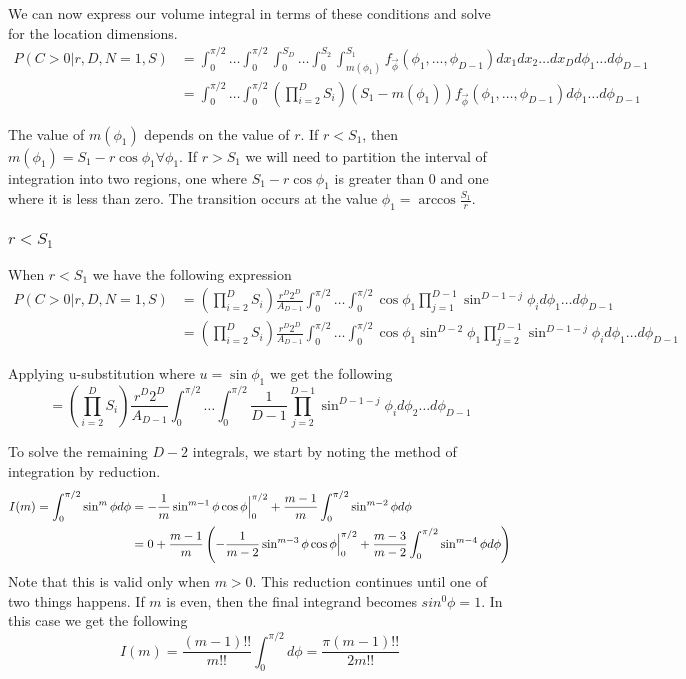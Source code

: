 \documentclass{article}
\begin{document}
We can now express our volume integral in terms of these conditions and solve for the location dimensions.
\begin{align} \label{eq:volume integral}
	P(C>0|r, D, N=1, S) &= \int_0^{\pi/2} \hdots \int_0^{\pi/2} \int_0^{S_D} \hdots \int_0^{S_2} \int_{m(\phi_1)}^{S_1} f_{\vec\phi}(\phi_1,\hdots,\phi_{D-1})dx_1 dx_2 \hdots dx_D d\phi_1 \hdots d\phi_{D-1}\\
	&= \int_0^{\pi/2} \hdots \int_0^{\pi/2}\left(\prod_{i=2}^DS_i\right)\left(S_1-m(\phi_1)\right)  f_{\vec\phi}(\phi_1,\hdots,\phi_{D-1}) d\phi_1\hdots d\phi_{D-1}
\end{align}

The value of $m(\phi_1)$ depends on the value of $r$. If $r<S_1$, then $m(\phi_1)=S_1-r\cos \phi_1 \forall \phi_1$. If $r>S_1$ we will need to partition the interval of integration into
two regions, one where $S_1-r\cos{\phi_1}$ is greater than 0 and one where it is less than zero. The transition occurs at the value $\phi_1 = \arccos{\frac{S_1}{r}}$.

\subsubsection{$r<S_1$}
When $r<S_1$ we have the following expression
\begin{align}
	P(C>0|r, D, N=1, S) &= \left(\prod_{i=2}^DS_i\right)\frac{r^D 2^D}{A_{D-1}}\int_0^{\pi/2} \hdots \int_0^{\pi/2} \cos\phi_1 \prod_{j=1}^{D-1}\sin^{D-1-j}\phi_i d\phi_1\hdots d\phi_{D-1}\\
	&= \left(\prod_{i=2}^DS_i\right)\frac{r^D 2^D}{A_{D-1}}\int_0^{\pi/2} \hdots \int_0^{\pi/2} \cos\phi_1\sin^{D-2}\phi_1 \prod_{j=2}^{D-1}\sin^{D-1-j}\phi_i d\phi_1\hdots d\phi_{D-1}
\end{align}

Applying u-substitution where $u=\sin\phi_1$ we get the following
\begin{equation} \label{eq:final phi integral}
	= \left(\prod_{i=2}^DS_i\right)\frac{r^D 2^D}{A_{D-1}}\int_0^{\pi/2} \hdots \int_0^{\pi/2} \frac{1}{D-1} \prod_{j=2}^{D-1}\sin^{D-1-j}\phi_i d\phi_2\hdots d\phi_{D-1}
\end{equation}

To solve the remaining $D-2$ integrals, we start by noting the method of integration by reduction.
\begin{align}
	I(m) = \int_0^{\pi/2} \sin^m \phi d\phi &= -\frac{1}{m}\sin^{m-1}\phi \cos\phi \Big{|}_0^{\pi/2} + \frac{m-1}{m}\int_0^{\pi/2}\sin^{m-2}\phi d\phi\\
	&= 0 + \frac{m-1}{m}\left(-\frac{1}{m-2}\sin^{m-3}\phi \cos\phi \Big{|}_0^{\pi/2} + \frac{m-3}{m-2}\int_0^{\pi/2}\sin^{m-4}\phi d\phi\right)
\end{align}
Note that this is valid only when $m>0$. This reduction continues until one of two things happens. If $m$ is even, then the final integrand becomes $sin^0\phi = 1$. 
In this case we get the following
\begin{equation} \label{eq:m even}
	I(m) = \frac{(m-1)!!}{m!!}\int_0^{\pi/2} d\phi = \frac{\pi (m-1)!!}{2m!!}
\end{equation}
\end{document}
